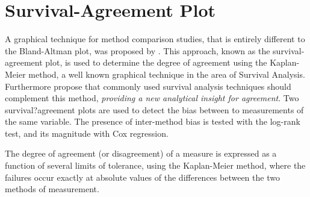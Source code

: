 \documentclass[12pt, a4paper]{report}
\theoremstyle{plain}
\theoremstyle{definition}
\theoremstyle{remark}
\begin{document}
	
	
	

	\section{Survival-Agreement Plot}
	A graphical technique for method comparison studies, that is entirely different to the Bland-Altman plot, was proposed by \citet{luiz}. This approach, known as the survival-agreement plot, is used to determine the degree of agreement using the Kaplan-Meier method, a well known graphical technique in the area of Survival Analysis. Furthermore \citet{luiz} propose that commonly used survival analysis techniques should complement this method,\textit{ providing a new analytical insight
		for agreement}. Two survival?agreement plots are used to detect the bias between to measurements of the same variable. The presence of inter-method bias is tested with the log-rank test, and its magnitude with Cox regression.
	
	
	The degree of agreement (or disagreement) of a measure is expressed as a function of several limits of tolerance, using the Kaplan-Meier method, where the failures occur exactly at absolute values of the differences between the two methods of measurement. 
	
\end{document}

